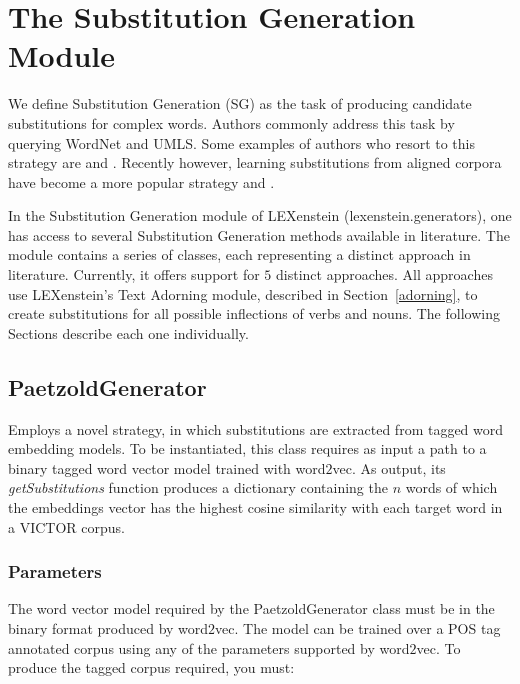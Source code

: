 \chapter{The Substitution Generation Module}
\label{sg}

We define Substitution Generation (SG) as the task of producing candidate substitutions for complex words. Authors commonly address this task by querying WordNet \cite{wordnet} and UMLS\cite{Bodenreider04}. Some examples of authors who resort to this strategy are \cite{Devlin1998} and \cite{Carroll99}. Recently however, learning substitutions from aligned corpora have become a more popular strategy \cite{Paetzold2013} and \cite{Horn2014}.

In the Substitution Generation module of LEXenstein (lexenstein.generators), one has access to several Substitution Generation methods available in literature. The module contains a series of classes, each representing a distinct approach in literature. Currently, it offers support for $5$ distinct approaches. All approaches use LEXenstein's Text Adorning module, described in Section~\ref{adorning}, to create substitutions for all possible inflections of verbs and nouns. The following Sections describe each one individually.








\section{PaetzoldGenerator}

Employs a novel strategy, in which substitutions are extracted from tagged word embedding models. To be instantiated, this class requires as input a path to a binary tagged word vector model trained with word$2$vec. As output, its \textit{getSubstitutions} function produces a dictionary containing the $n$ words of which the embeddings vector has the highest cosine similarity with each target word in a VICTOR corpus.

\subsection{Parameters}

The word vector model required by the PaetzoldGenerator class must be in the binary format produced by word$2$vec. The model can be trained over a POS tag annotated corpus using any of the parameters supported by word$2$vec. To produce the tagged corpus required, you must:

